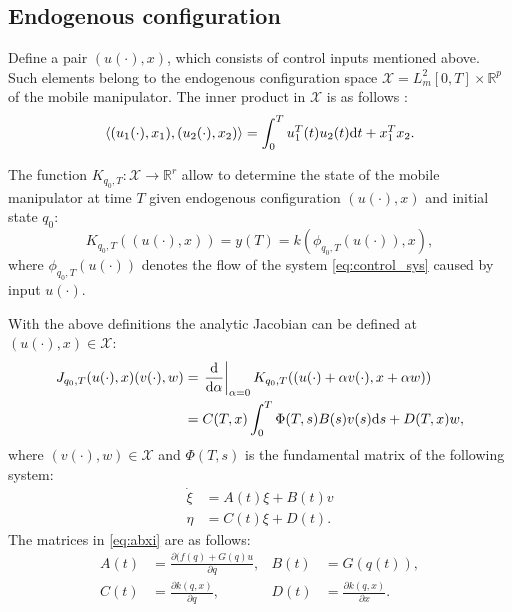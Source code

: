 \subsection{Endogenous configuration}
Define a pair $(u(\cdot), x)$, which consists of control inputs mentioned above.
Such elements belong to the endogenous configuration space
$\mathcal{X} = L_m^2[0, T] \times \mathbb{R}^p$ of the mobile manipulator.
The inner product in $\mathcal{X}$ is as follows \cite{ecs_ijc}:
\begin{equation}
\langle (u_1(\cdot), x_1), (u_2(\cdot), x_2) \rangle = \int_0^T u_1^T(t) u_2(t) \mathrm{d} t + x_1^T x_2.
\end{equation}

The function
$K_{q_0, T}: \mathcal{X} \rightarrow \mathbb{R}^r$
allow to determine the state of the mobile manipulator at time $T$ given
endogenous configuration $(u(\cdot), x)$ and initial state $q_0$:
\begin{equation}
K_{q_0, T}((u(\cdot), x)) = y(T) = k(\phi_{q_0, T}(u(\cdot)), x),
\end{equation}
where $\phi_{q_0, T}(u(\cdot))$ denotes the flow of the system \eqref{eq:control_sys}
caused by input $u(\cdot)$.

With the above definitions the analytic Jacobian can be defined at $(u(\cdot), x) \in \mathcal{X}$:
\begin{align}
J_{q_0, T}(u(\cdot), x)(v(\cdot), w) &= \left.\frac{\mathrm{d}}{\mathrm{d} \alpha}\right|_{\alpha=0} K_{q_0, T}((u(\cdot)+\alpha v(\cdot), x+\alpha w))\\
 &= C(T,x)\int_0^T \Phi(T,s)B(s)v(s)\mathrm{d} s + D(T,x)w,
\end{align}
where $(v(\cdot), w)\in \mathcal{X}$ and $\Phi(T,s)$ is the fundamental matrix of the following system:
\begin{equation}
\begin{aligned}
\label{eq:abxi}
\dot \xi &= A(t)\xi + B(t) v \\
\eta &= C(t)\xi + D(t).
\end{aligned}
\end{equation}
The matrices in \eqref{eq:abxi} are as follows:
\begin{equation}
\begin{aligned}
A(t) &= \frac{\partial (f(q)+G(q)u}{\partial q}, & B(t) &= G(q(t)),\\
C(t) &= \frac{\partial k(q, x)}{\partial q}, & D(t) &= \frac{\partial k(q, x)}{\partial x}.
\end{aligned}
\end{equation}

